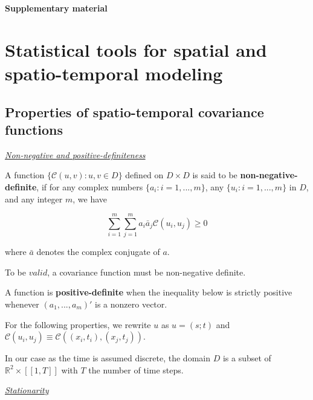 \appendix
{} %

\vspace*{\fill}
\begin{center}
\Huge \textbf{Supplementary material} \normalsize
\end{center}
\vspace*{\fill}



\chapter{Statistical tools for spatial and spatio-temporal modeling}

\section{Properties of spatio-temporal covariance functions}\label{appendix:cov_prop}

\vspace{\baselineskip}

\underline{\textit{Non-negative and positive-definiteness}}

A function $\{\mathcal{C}(u,v):u,v\in D\}$ defined on $D \times D$ is said to be \textbf{non-negative-definite}, if for any complex numbers $\{a_i:i=1,...,m\}$, any $\{u_i:i=1,...,m\}$ in $D$, and any integer $m$, we have 

$$\sum^m_{i=1}\sum^m_{j=1}a_i \bar{a}_j \mathcal{C}(u_i,u_j) \geq 0$$

where $\bar{a}$ denotes the complex conjugate of $a$.

To be $valid$, a covariance function must be non-negative definite.

A function is \textbf{positive-definite} when the inequality below is strictly positive whenever $(a_1,...,a_m)'$ is a nonzero vector.

For the following properties, we rewrite $u$ as $u = (s;t)$ and $\mathcal{C}(u_i,u_j) \equiv \mathcal{C}((x_i,t_i),(x_j,t_j))$.

In our case as the time is assumed discrete, the domain $D$ is a subset of $\mathbb{R}^2 \times [\![1,T]\!]$ with $T$ the number of time steps.

\vspace{\baselineskip}

\underline{\textit{Stationarity}}

